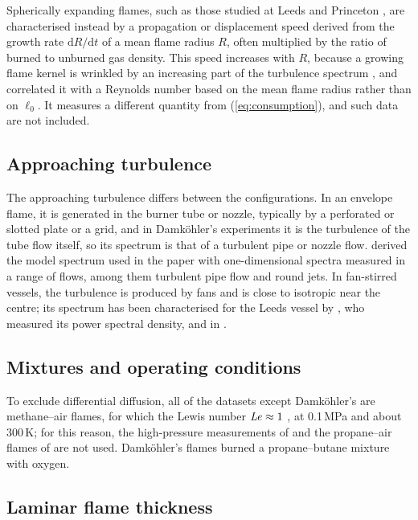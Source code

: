 \documentclass[11pt]{article}
\begin{document}
Spherically expanding flames, such as those studied at Leeds \citep{Bradley2003,Lawes2012} and Princeton \citep{Chaudhuri2012,Wu2015}, are characterised instead by a propagation or displacement speed derived from the growth rate $\mathrm{d}R / \mathrm{d}t$ of a mean flame radius $R$, often multiplied by the ratio of burned to unburned gas density. This speed increases with $R$, because a growing flame kernel is wrinkled by an increasing part of the turbulence spectrum \citep{AbdelGayed1987,Bradley2003,Lawes2012}, and \citet{Chaudhuri2012} correlated it with a Reynolds number based on the mean flame radius rather than on $\ell_0$. It measures a different quantity from (\ref{eq:consumption}), and such data are not included.

\subsection{Approaching turbulence}\label{sec:turbulence}

The approaching turbulence differs between the configurations. In an envelope flame, it is generated in the burner tube or nozzle, typically by a perforated or slotted plate or a grid, and in Damk\"ohler's experiments it is the turbulence of the tube flow itself, so its spectrum is that of a turbulent pipe or nozzle flow. \citet[][figure~6.14]{Pope2000} derived the model spectrum used in the paper with one-dimensional spectra measured in a range of flows, among them turbulent pipe flow and round jets. In fan-stirred vessels, the turbulence is produced by fans and is close to isotropic near the centre; its spectrum has been characterised for the Leeds vessel by \citet{AbdelGayed1987}, who measured its power spectral density, and in \citet{Walker2019}.

\subsection{Mixtures and operating conditions}\label{sec:mixtures}

To exclude differential diffusion, all of the datasets except Damk\"ohler's are methane--air flames, for which the Lewis number $\mbox{\textit{Le}} \approx 1$ \citep[e.g.][]{Kobayashi1996}, at 0.1\,MPa and about 300\,K; for this reason, the high-pressure measurements of \citet{Kobayashi1996} and the propane--air flames of \citet{YuenGulder2013} are not used. Damk\"ohler's flames burned a propane--butane mixture with oxygen.

\subsection{Laminar flame thickness}\label{sec:thickness}
\end{document}
